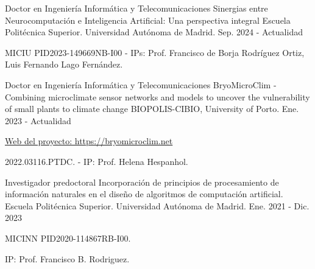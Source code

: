 
\begin{cventries}
\cventry
{Doctor en Ingeniería Informática y Telecomunicaciones} %
{Sinergias entre Neurocomputación e Inteligencia Artificial: Una perspectiva integral} %
{Escuela Politécnica Superior. Universidad Autónoma de Madrid.} %
{Sep. 2024 - Actualidad} %
{
	\begin{cvitems} %
		\item {MICIU PID2023-149669NB-I00 - IPs: Prof. Francisco de Borja Rodríguez Ortiz, Luis Fernando Lago Fernández. }
	\end{cvitems}
}

  \cventry
    {Doctor en Ingeniería Informática y Telecomunicaciones} %
    {BryoMicroClim - Combining microclimate sensor networks and models to uncover the vulnerability of small plants to climate change} %
    {BIOPOLIS-CIBIO, University of Porto.} %
    {Ene. 2023 - Actualidad} %
    {
      \begin{cvitems} %
      	\item {\href{https://bryomicroclim.net/en/}{\underline{Web del proyecto: https://bryomicroclim.net}} }
        \item {2022.03116.PTDC. - IP: Prof. Helena Hespanhol.}
      \end{cvitems}
    }

  \cventry
    {Investigador predoctoral} %
    {Incorporación de principios de procesamiento de información naturales en el diseño de algoritmos de computación artificial.} %
    {Escuela Politécnica Superior. Universidad Autónoma de Madrid.} %
    {Ene. 2021 - Dic. 2023} %
    {
      \begin{cvitems} %
        \item {MICINN PID2020-114867RB-I00.}
        \item {IP: Prof. Francisco B. Rodriguez.}
      \end{cvitems}
    }


\end{cventries}
